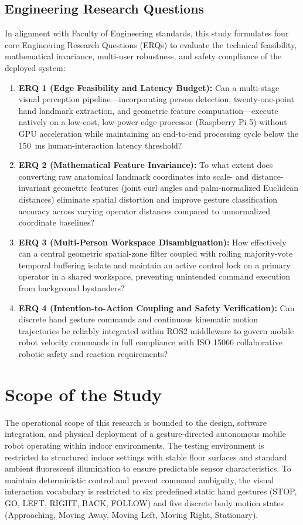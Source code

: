 \subsection{Engineering Research Questions}
In alignment with Faculty of Engineering standards, this study formulates four core Engineering Research Questions (ERQs) to evaluate the technical feasibility, mathematical invariance, multi-user robustness, and safety compliance of the deployed system:
\begin{enumerate}
    \item \textbf{ERQ 1 (Edge Feasibility and Latency Budget):} Can a multi-stage visual perception pipeline—incorporating person detection, twenty-one-point hand landmark extraction, and geometric feature computation—execute natively on a low-cost, low-power edge processor (Raspberry Pi 5) without GPU acceleration while maintaining an end-to-end processing cycle below the 150~ms human-interaction latency threshold?
    \item \textbf{ERQ 2 (Mathematical Feature Invariance):} To what extent does converting raw anatomical landmark coordinates into scale- and distance-invariant geometric features (joint curl angles and palm-normalized Euclidean distances) eliminate spatial distortion and improve gesture classification accuracy across varying operator distances compared to unnormalized coordinate baselines?
    \item \textbf{ERQ 3 (Multi-Person Workspace Disambiguation):} How effectively can a central geometric spatial-zone filter coupled with rolling majority-vote temporal buffering isolate and maintain an active control lock on a primary operator in a shared workspace, preventing unintended command execution from background bystanders?
    \item \textbf{ERQ 4 (Intention-to-Action Coupling and Safety Verification):} Can discrete hand gesture commands and continuous kinematic motion trajectories be reliably integrated within ROS2 middleware to govern mobile robot velocity commands in full compliance with ISO 15066 collaborative robotic safety and reaction requirements?
\end{enumerate}

\section{Scope of the Study}
The operational scope of this research is bounded to the design, software integration, and physical deployment of a gesture-directed autonomous mobile robot operating within indoor environments. The testing environment is restricted to structured indoor settings with stable floor surfaces and standard ambient fluorescent illumination to ensure predictable sensor characteristics. To maintain deterministic control and prevent command ambiguity, the visual interaction vocabulary is restricted to six predefined static hand gestures (STOP, GO, LEFT, RIGHT, BACK, FOLLOW) and five discrete body motion states (Approaching, Moving Away, Moving Left, Moving Right, Stationary). 

